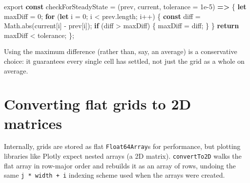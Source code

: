 \documentclass[
  letterpaper,
  DIV=11,
  numbers=noendperiod]{scrreprt}
\newenvironment{Shaded}{\begin{snugshade}}{\end{snugshade}}
\newcommand{\AttributeTok}[1]{\textcolor[rgb]{0.40,0.45,0.13}{#1}}
\newcommand{\BuiltInTok}[1]{\textcolor[rgb]{0.00,0.23,0.31}{#1}}
\newcommand{\ControlFlowTok}[1]{\textcolor[rgb]{0.00,0.23,0.31}{\textbf{#1}}}
\newcommand{\DecValTok}[1]{\textcolor[rgb]{0.68,0.00,0.00}{#1}}
\newcommand{\FloatTok}[1]{\textcolor[rgb]{0.68,0.00,0.00}{#1}}
\newcommand{\FunctionTok}[1]{\textcolor[rgb]{0.28,0.35,0.67}{#1}}
\newcommand{\ImportTok}[1]{\textcolor[rgb]{0.00,0.46,0.62}{#1}}
\newcommand{\KeywordTok}[1]{\textcolor[rgb]{0.00,0.23,0.31}{\textbf{#1}}}
\newcommand{\NormalTok}[1]{\textcolor[rgb]{0.00,0.23,0.31}{#1}}
\newcommand{\OperatorTok}[1]{\textcolor[rgb]{0.37,0.37,0.37}{#1}}
\begin{document}
\label{helpers-steady-state}%
\begin{Shaded}
\begin{Highlighting}[]
\ImportTok{export} \KeywordTok{const}\NormalTok{ checkForSteadyState }\OperatorTok{=}\NormalTok{ (prev}\OperatorTok{,}\NormalTok{ current}\OperatorTok{,}\NormalTok{ tolerance }\OperatorTok{=} \FloatTok{1e{-}5}\NormalTok{) }\KeywordTok{=\textgreater{}}\NormalTok{ \{}
    \KeywordTok{let}\NormalTok{ maxDiff }\OperatorTok{=} \DecValTok{0}\OperatorTok{;}
    \ControlFlowTok{for}\NormalTok{ (}\KeywordTok{let}\NormalTok{ i }\OperatorTok{=} \DecValTok{0}\OperatorTok{;}\NormalTok{ i }\OperatorTok{\textless{}}\NormalTok{ prev}\OperatorTok{.}\AttributeTok{length}\OperatorTok{;}\NormalTok{ i}\OperatorTok{++}\NormalTok{) \{}
        \KeywordTok{const}\NormalTok{ diff }\OperatorTok{=} \BuiltInTok{Math}\OperatorTok{.}\FunctionTok{abs}\NormalTok{(current[i] }\OperatorTok{{-}}\NormalTok{ prev[i])}\OperatorTok{;}
        \ControlFlowTok{if}\NormalTok{ (diff }\OperatorTok{\textgreater{}}\NormalTok{ maxDiff) \{}
\NormalTok{            maxDiff }\OperatorTok{=}\NormalTok{ diff}\OperatorTok{;}
\NormalTok{        \}}
\NormalTok{    \}}
    \ControlFlowTok{return}\NormalTok{ maxDiff }\OperatorTok{\textless{}}\NormalTok{ tolerance}\OperatorTok{;}
\NormalTok{\}}\OperatorTok{;}
\end{Highlighting}
\end{Shaded}

Using the maximum difference (rather than, say, an average) is a
conservative choice: it guarantees every single cell has settled, not
just the grid as a whole on average.

\section{Converting flat grids to 2D
matrices}\label{converting-flat-grids-to-2d-matrices}

Internally, grids are stored as flat \texttt{Float64Array}s for
performance, but plotting libraries like Plotly expect nested arrays (a
2D matrix). \texttt{convertTo2D} walks the flat array in row-major order
and rebuilds it as an array of rows, undoing the same
\texttt{j\ *\ width\ +\ i} indexing scheme used when the arrays were
created.
\end{document}
